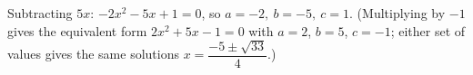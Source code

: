 Subtracting $5x$: $\boxed{-2x^2-5x+1=0}$, so $\boxed{a=-2,\ b=-5,\ c=1}$. (Multiplying by $-1$ gives the equivalent form $2x^2+5x-1=0$ with $a=2$, $b=5$, $c=-1$; either set of values gives the same solutions $x=\dfrac{-5\pm\sqrt{33}}{4}$.)
